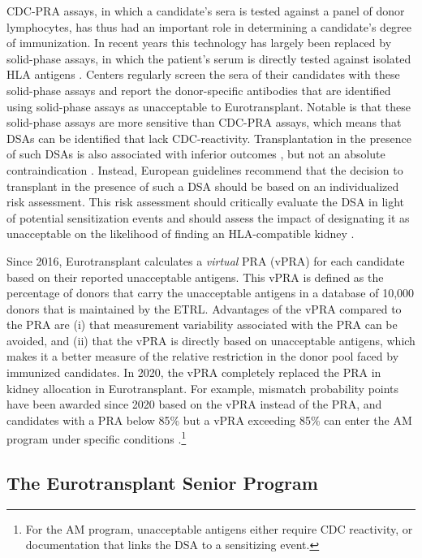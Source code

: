 \documentclass[11pt,twoside,]{book}
\let\rmarkdownfootnote\footnote%
\def\footnote{\protect\rmarkdownfootnote}
\begin{document}
CDC-PRA assays, in which a candidate's sera is tested against a panel of donor
lymphocytes, has thus had an important role in determining a candidate's degree
of immunization. In recent years this technology has largely been replaced by solid-phase assays,
in which the patient's serum is directly tested against isolated HLA antigens \citep{Mamode2022}.
Centers regularly screen the sera of their candidates with these solid-phase assays and
report the donor-specific antibodies that are identified using solid-phase assays as unacceptable to
Eurotransplant. Notable is that these solid-phase assays are more sensitive
than CDC-PRA assays, which means that DSAs can be identified that lack
CDC-reactivity. Transplantation in the presence of such DSAs is also associated
with inferior outcomes \citep{Amico2009}, but not an absolute contraindication \citep{Mulley2011}.
Instead, European guidelines recommend that the decision to transplant in the
presence of such a DSA should be based on an individualized risk assessment.
This risk assessment should critically evaluate the DSA in light of potential
sensitization events and should assess the impact of designating it as unacceptable
on the likelihood of finding an HLA-compatible kidney \citep{Mamode2022}.

Since 2016, Eurotransplant calculates a \emph{virtual} PRA (vPRA) for each candidate
based on their reported unacceptable antigens. This vPRA is defined
as the percentage of donors that carry the unacceptable antigens in a database
of 10,000 donors that is maintained by the ETRL. Advantages of the
vPRA compared to the PRA are (i) that measurement variability associated with the
PRA can be avoided, and (ii) that the vPRA is directly based on unacceptable antigens,
which makes it a better measure of the relative restriction in the
donor pool faced by immunized candidates. In 2020, the vPRA completely replaced the PRA in
kidney allocation in Eurotransplant. For example, mismatch probability points have
been awarded since 2020 based on the vPRA instead of the PRA, and candidates
with a PRA below 85\% but a vPRA exceeding 85\% can enter the AM program under specific conditions
\citep{Heidt2015}.\footnote{For the AM program,
  unacceptable antigens either require CDC
  reactivity, or documentation that links the DSA to a sensitizing event.}

\vfill
\newpage
\subsection[Eurotransplant Senior Program]{The Eurotransplant Senior Program}
\label{sec:introesp}
\end{document}
